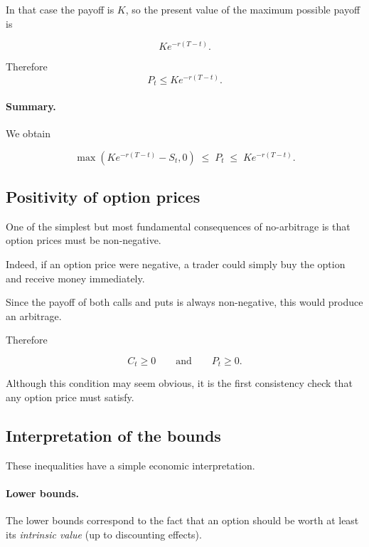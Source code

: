 \documentclass[11pt]{article}
\newcommand{\1}{\mathbf{1}}
\theoremstyle{plain}
\theoremstyle{definition}
\theoremstyle{remark}
\begin{document}
In that case the payoff is \(K\), so the present value of the maximum
possible payoff is

\[
K e^{-r(T-t)}.
\]

Therefore
\[
\boxed{
P_t \le K e^{-r(T-t)}.
}
\]

\paragraph{Summary.}

We obtain

\[
\boxed{
\max(K e^{-r(T-t)}-S_t,0)
\;\le\;
P_t
\;\le\;
K e^{-r(T-t)}.
}
\]

\subsection{Positivity of option prices}

One of the simplest but most fundamental consequences of no-arbitrage
is that option prices must be non-negative.

Indeed, if an option price were negative, a trader could simply
buy the option and receive money immediately.

Since the payoff of both calls and puts is always non-negative,
this would produce an arbitrage.

Therefore

\[
\boxed{
C_t \ge 0
\qquad
\text{and}
\qquad
P_t \ge 0.
}
\]

Although this condition may seem obvious, it is the first consistency
check that any option price must satisfy.

\subsection{Interpretation of the bounds}

These inequalities have a simple economic interpretation.

\paragraph{Lower bounds.}

The lower bounds correspond to the fact that an option should be worth
at least its \emph{intrinsic value} (up to discounting effects).
\end{document}
